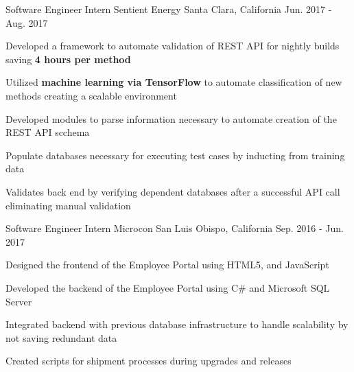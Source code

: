 \begin{cventries}
\cventry
{Software Engineer Intern} %
{Sentient Energy} %
{Santa Clara, California} %
{Jun. 2017 - Aug. 2017} %
{ %
\begin{cvitems}
\item {Developed a framework to automate validation of REST API for nightly builds saving \textbf{4 hours per method}}
\item {Utilized \textbf{machine learning via TensorFlow} to automate classification of new methods creating a scalable environment}
\item {Developed modules to parse information necessary to automate creation of the REST API scchema}
\item {Populate databases necessary for executing test cases by inducting from training data}
\item {Validates back end by verifying dependent databases after a successful API call eliminating manual validation}
\end{cvitems}
}


\cventry
{Software Engineer Intern} %
{Microcon} %
{San Luis Obispo, California} %
{Sep. 2016 - Jun. 2017} %
{ %
\begin{cvitems}
\item {Designed the frontend of the Employee Portal using HTML5, and JavaScript}
\item {Developed the backend of the Employee Portal using C\# and Microsoft SQL Server}
\item {Integrated backend with previous database infrastructure to handle scalability by not saving redundant data}
\item {Created scripts for shipment processes during upgrades and releases}
\end{cvitems}
}




\end{cventries}
